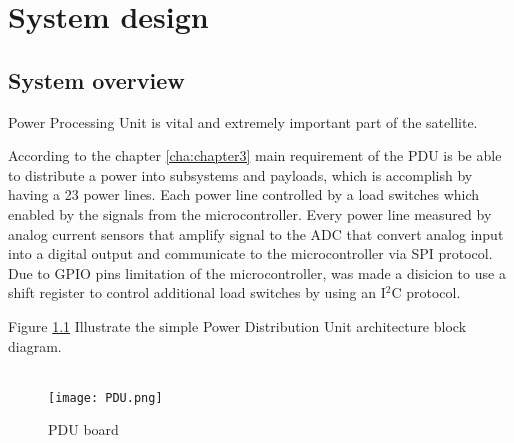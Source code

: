 \chapter{System design\label{sec:tech77}}

\section{System overview}
Power Processing Unit is vital and extremely important part of the satellite.  

 According to the chapter \ref*{cha:chapter3} main requirement of the PDU is  be able to distribute a power into subsystems and payloads, which is accomplish by having a 23 power lines. Each power line controlled by a load switches which enabled by the signals from the microcontroller. Every power line measured by analog current sensors that amplify signal to the ADC that convert analog input into a digital output and communicate to the microcontroller via SPI protocol. Due to GPIO pins limitation of the microcontroller, was made a disicion to use a shift register to control additional load switches by using an I$^2$C protocol. 
 
 
  Figure \ref{fig: PDU} Illustrate the simple Power Distribution Unit architecture block diagram.\\ \\


 \begin{figure}[h]
 	\centering
 	\texttt{[image: PDU.png]}
 	\caption{PDU board}
 	\label{fig: PDU}
 \end{figure} 

